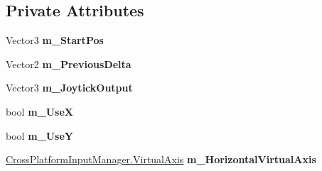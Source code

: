 \subsection*{Private Attributes}
\begin{DoxyCompactItemize}
\item 
\mbox{\label{class_unity_standard_assets_1_1_cross_platform_input_1_1_touch_pad_a1771088ac0b6ac64a2a4cd01ee9e4e81}} 
Vector3 {\bfseries m\+\_\+\+Start\+Pos}
\item 
\mbox{\label{class_unity_standard_assets_1_1_cross_platform_input_1_1_touch_pad_afb4faca673ee2a4f9a2af041c4820feb}} 
Vector2 {\bfseries m\+\_\+\+Previous\+Delta}
\item 
\mbox{\label{class_unity_standard_assets_1_1_cross_platform_input_1_1_touch_pad_a7a8100793443f3133d7be118287b77e5}} 
Vector3 {\bfseries m\+\_\+\+Joytick\+Output}
\item 
\mbox{\label{class_unity_standard_assets_1_1_cross_platform_input_1_1_touch_pad_a1320e5a84e9360b022e022d60d1a8fc8}} 
bool {\bfseries m\+\_\+\+UseX}
\item 
\mbox{\label{class_unity_standard_assets_1_1_cross_platform_input_1_1_touch_pad_a7e63a0b0e5bf4d6a5d4c2c01743e30e8}} 
bool {\bfseries m\+\_\+\+UseY}
\item 
\mbox{\label{class_unity_standard_assets_1_1_cross_platform_input_1_1_touch_pad_a6c88f43906ffa5ed79f1d2e57f8324cc}} 
\hyperlink{class_unity_standard_assets_1_1_cross_platform_input_1_1_cross_platform_input_manager_1_1_virtual_axis}{Cross\+Platform\+Input\+Manager.\+Virtual\+Axis} {\bfseries m\+\_\+\+Horizontal\+Virtual\+Axis}
\item 
\mbox{\label{class_unity_standard_assets_1_1_cross_platform_input_1_1_touch_pad_adf78c6c22aa52989bfbaf093cca220a6}} 

\end{DoxyCompactItemize}
